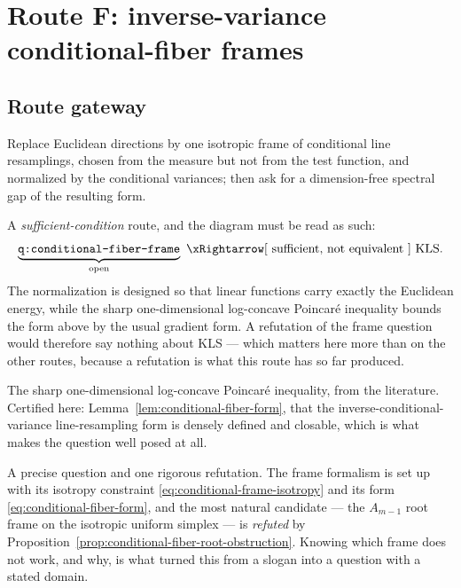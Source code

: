 \documentclass[../../main.tex]{subfiles}
\begin{document}
\section{Route F: inverse-variance conditional-fiber frames}
\label{sec:conditional-fiber-frame}

\subsection*{Route gateway}

\begin{description}[leftmargin=0pt,style=nextline,itemsep=0.3em]
  \item[1. Thesis.] Replace Euclidean directions by one isotropic frame of conditional line
  resamplings, chosen from the measure but not from the test function, and normalized by the
  conditional variances; then ask for a dimension-free spectral gap of the resulting form.

  \item[2. Bridge to KLS.] A \emph{sufficient-condition} route, and the diagram must be read
  as such:
  \[
    \underbrace{\texttt{q:conditional-fiber-frame}}_{\text{open}}
    \ \xRightarrow[\ \text{sufficient, not equivalent}\ ]{}\
    \text{KLS}.
  \]
  The normalization is designed so that linear functions carry exactly the Euclidean energy,
  while the sharp one-dimensional log-concave Poincar\'e inequality bounds the form above by
  the usual gradient form. A refutation of the frame question would therefore say nothing about
  KLS --- which matters here more than on the other routes, because a refutation is what this
  route has so far produced.

  \item[3. Established inputs.] The sharp one-dimensional log-concave Poincar\'e inequality,
  from the literature. Certified here: Lemma~\ref{lem:conditional-fiber-form}, that the
  inverse-conditional-variance line-resampling form is densely defined and closable, which is
  what makes the question well posed at all.

  \item[4. Main advance so far.] A precise question and one rigorous refutation. The frame
  formalism is set up with its isotropy constraint \eqref{eq:conditional-frame-isotropy} and
  its form \eqref{eq:conditional-fiber-form}, and the most natural candidate --- the
  $A_{m-1}$ root frame on the isotropic uniform simplex --- is \emph{refuted} by
  Proposition~\ref{prop:conditional-fiber-root-obstruction}. Knowing which frame does not work,
  and why, is what turned this from a slogan into a question with a stated domain.


\end{description}
\end{document}
